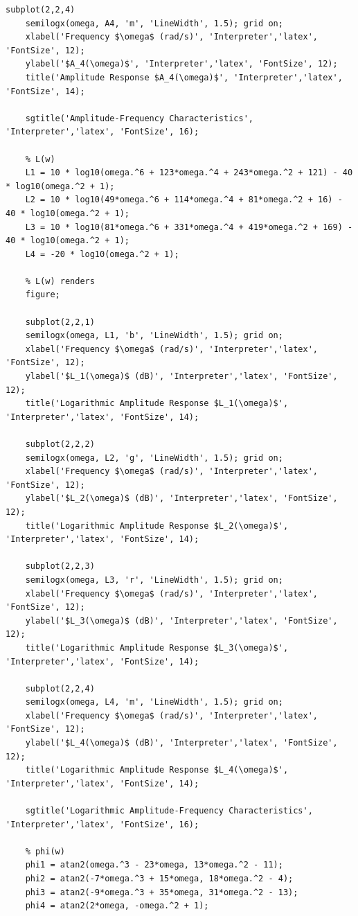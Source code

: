 \documentclass[a4paper, 12pt]{article}
\begin{document}
\begin{lstlisting}[label=task1, caption={Программа для задания 1}]
    subplot(2,2,4)
    semilogx(omega, A4, 'm', 'LineWidth', 1.5); grid on;
    xlabel('Frequency $\omega$ (rad/s)', 'Interpreter','latex', 'FontSize', 12);
    ylabel('$A_4(\omega)$', 'Interpreter','latex', 'FontSize', 12);
    title('Amplitude Response $A_4(\omega)$', 'Interpreter','latex', 'FontSize', 14);

    sgtitle('Amplitude-Frequency Characteristics', 'Interpreter','latex', 'FontSize', 16);

    % L(w)
    L1 = 10 * log10(omega.^6 + 123*omega.^4 + 243*omega.^2 + 121) - 40 * log10(omega.^2 + 1);
    L2 = 10 * log10(49*omega.^6 + 114*omega.^4 + 81*omega.^2 + 16) - 40 * log10(omega.^2 + 1);
    L3 = 10 * log10(81*omega.^6 + 331*omega.^4 + 419*omega.^2 + 169) - 40 * log10(omega.^2 + 1);
    L4 = -20 * log10(omega.^2 + 1);

    % L(w) renders
    figure;

    subplot(2,2,1)
    semilogx(omega, L1, 'b', 'LineWidth', 1.5); grid on;
    xlabel('Frequency $\omega$ (rad/s)', 'Interpreter','latex', 'FontSize', 12);
    ylabel('$L_1(\omega)$ (dB)', 'Interpreter','latex', 'FontSize', 12);
    title('Logarithmic Amplitude Response $L_1(\omega)$', 'Interpreter','latex', 'FontSize', 14);

    subplot(2,2,2)
    semilogx(omega, L2, 'g', 'LineWidth', 1.5); grid on;
    xlabel('Frequency $\omega$ (rad/s)', 'Interpreter','latex', 'FontSize', 12);
    ylabel('$L_2(\omega)$ (dB)', 'Interpreter','latex', 'FontSize', 12);
    title('Logarithmic Amplitude Response $L_2(\omega)$', 'Interpreter','latex', 'FontSize', 14);

    subplot(2,2,3)
    semilogx(omega, L3, 'r', 'LineWidth', 1.5); grid on;
    xlabel('Frequency $\omega$ (rad/s)', 'Interpreter','latex', 'FontSize', 12);
    ylabel('$L_3(\omega)$ (dB)', 'Interpreter','latex', 'FontSize', 12);
    title('Logarithmic Amplitude Response $L_3(\omega)$', 'Interpreter','latex', 'FontSize', 14);

    subplot(2,2,4)
    semilogx(omega, L4, 'm', 'LineWidth', 1.5); grid on;
    xlabel('Frequency $\omega$ (rad/s)', 'Interpreter','latex', 'FontSize', 12);
    ylabel('$L_4(\omega)$ (dB)', 'Interpreter','latex', 'FontSize', 12);
    title('Logarithmic Amplitude Response $L_4(\omega)$', 'Interpreter','latex', 'FontSize', 14);

    sgtitle('Logarithmic Amplitude-Frequency Characteristics', 'Interpreter','latex', 'FontSize', 16);

    % phi(w)
    phi1 = atan2(omega.^3 - 23*omega, 13*omega.^2 - 11);
    phi2 = atan2(-7*omega.^3 + 15*omega, 18*omega.^2 - 4);
    phi3 = atan2(-9*omega.^3 + 35*omega, 31*omega.^2 - 13);
    phi4 = atan2(2*omega, -omega.^2 + 1);


\end{lstlisting}
\end{document}
